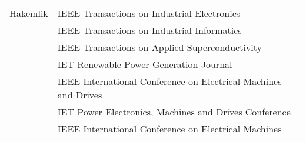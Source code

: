 \documentclass[a4paper,12pt]{article}
\begin{document}
\begin{tabular}{ll}
Hakemlik & IEEE Transactions on Industrial Electronics \\
& IEEE Transactions on Industrial Informatics \\
& IEEE Transactions on Applied Superconductivity\\
& IET Renewable Power Generation Journal \\
& IEEE International Conference on Electrical Machines and Drives \\
& IET Power Electronics, Machines and Drives Conference \\
& IEEE International Conference on Electrical Machines\\
\end{tabular}


\end{document}
